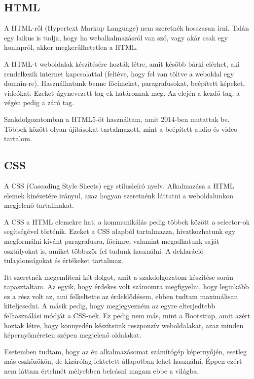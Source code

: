 \subsection{HTML}
A HTML-ről (Hypertext Markup Language) nem szeretnék hosszasan írni. Talán egy laikus is tudja, hogy ha webalkalmazásról van szó, vagy akár csak egy honlapról, akkor megkerülhetetlen a HTML.

A HTML-t weboldalak készítésére hozták létre, amit később bárki elérhet, aki rendelkezik internet kapcsolattal (feltéve, hogy fel van töltve a weboldal egy domain-re). Használhatunk benne főcímeket, paragrafusokat, beépített képeket, videókat. Ezeket úgynevezett tag-ek határoznak meg. Az elején a kezdő tag, a végén pedig a záró tag.

Szakdolgozatomban a HTML5-öt használtam, amit 2014-ben mutattak be. Többek között olyan újításokat tartalmazott, mint a beépített audio és video tartalom.
\cite{web}

\subsection{CSS}

A CSS (Cascading Style Sheets) egy stílusleíró nyelv. Alkalmazása a HTML elemek kinézetére irányul, azaz hogyan szeretnénk láttatni a weboldalunkon megjelenő tartalmakat.

A CSS a HTML elemekre hat, a kommunikálás pedig többek között a selector-ok segítségével történik. Ezeket a CSS alapból tartalmazza, hivatkozhatunk egy megformálni kívánt paragrafusra, főcímre, valamint megadhatunk saját osztályokat is, amiket többször fel tudunk használni. A deklaráció tulajdonságokat és értékeket tartalmaz.

Itt szeretnék megemlíteni két dolgot, amit a szakdolgozatom készítése során tapasztaltam. Az egyik, hogy érdekes volt számomra megfigyelni, hogy leginkább ez a rész volt az, ami felkeltette az érdeklődésem, ebben tudtam maximálisan kiteljesedni. A másik pedig, hogy megjegyezném az egyre elterjedtebb felhasználási módját a CSS-nek. Ez pedig nem más, mint a Bootstrap, amit azért hoztak létre, hogy könnyedén készítsünk reszponzív weboldalakat, azaz minden képernyőméreten szépen megjelenő oldalakat.

Esetemben tudtam, hogy az én alkalmazásomat számítógép képernyőjén, esetleg más eszközökön, de kizárólag fektetett állapotban lehet használni. Éppen ezért nem láttam értelmét mélyebben beleásni magam ebbe a világba.
\cite{web}


